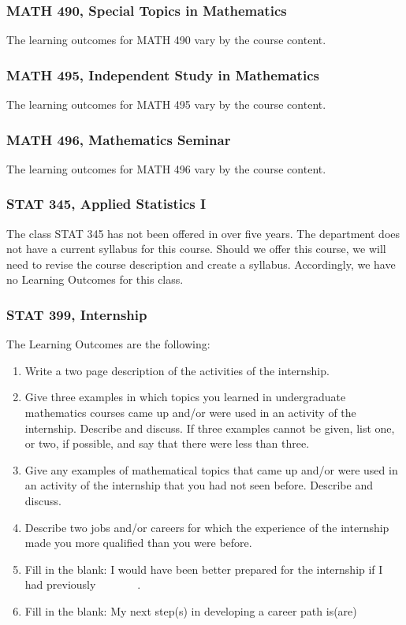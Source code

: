 \documentclass[11pt]{article}
\newenvironment{alphalist}{
\begin{enumerate}[label=(\arabic*),widest=107 ,leftmargin=25pt, itemsep=0pt]}
{\end{enumerate}}
\begin{document}
\subsubsection{MATH 490, Special Topics in Mathematics}

The learning outcomes for MATH 490 vary by the course content.

\subsubsection{MATH 495, Independent Study in Mathematics}


The learning outcomes for MATH 495 vary by the course content.

\subsubsection{MATH 496, Mathematics Seminar}

The learning outcomes for MATH 496 vary by the course content.


\subsubsection{STAT 345, Applied Statistics I}

The class STAT 345 has not been offered in over five years.  The
department does not have a current syllabus for this course. Should we offer this course,  we will need to revise
the course description and create a syllabus. Accordingly, we have no Learning Outcomes for this class.


\subsubsection{STAT 399, Internship}

The Learning Outcomes are the following:
\begin{alphalist}
    \item Write a two page description of the activities of the internship.
    \item Give three examples in which topics you learned in 
    undergraduate mathematics courses came up and/or were used in an activity of the internship. Describe and discuss. If three examples cannot be given, list one, or two, if possible, and say that there were less than three.
    \item Give any examples of mathematical topics that came up and/or were used in an activity of the internship that you had not seen before. Describe and discuss. 
    \item Describe two jobs and/or careers for which the experience of the internship made you more qualified than you were before.
    \item Fill in the blank: I would have been better prepared for the internship if I had previously \underline{$\phantom{xxxxxx}$}.
    \item Fill in the blank: My next step(s) in developing a career path is(are) \underline{$\phantom{xxxxxx}$}
\end{alphalist}
\end{document}
